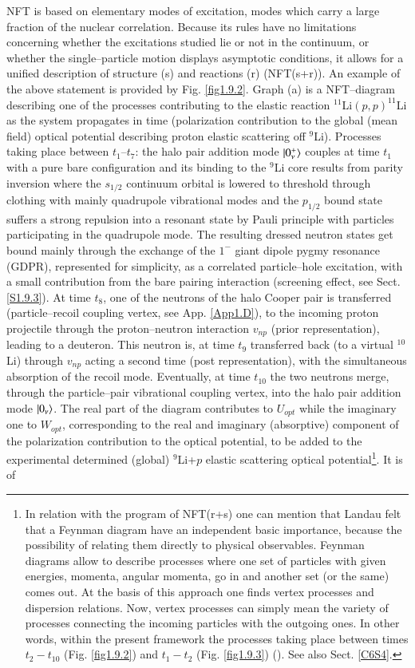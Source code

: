 NFT is based on elementary modes of excitation, modes which carry a large fraction of the nuclear correlation. Because its rules have no limitations concerning whether the excitations studied lie or not in the continuum, or whether the single--particle motion displays asymptotic conditions, it allows for a unified description of structure (s) and reactions (r) (NFT(s+r)). An example of the above statement is provided by Fig. \ref{fig1.9.2}. Graph (a) is a NFT--diagram describing one of the processes contributing to the elastic
reaction $^{11}$Li$(p,p)^{11}$Li as the system propagates in time (polarization contribution to
the global (mean field) optical potential describing proton elastic scattering off $^{9}$Li). Processes taking place between $t_1$--$t_7$:
the halo pair addition mode $|{0^+_\nu} \rangle$ couples at time $t_1$ with a pure bare configuration
and its binding to the $^9$Li core results from parity inversion where the $s_{1/2}$ continuum
orbital is lowered to threshold through clothing with mainly quadrupole vibrational
modes and the $p_{1/2}$ bound state suffers a strong repulsion into a resonant state by
Pauli principle with particles participating in the quadrupole mode. The resulting
dressed neutron states get bound mainly through the exchange of the $1^-$ giant dipole
pygmy resonance (GDPR), represented for simplicity, as a correlated particle--hole
excitation, with a small contribution from the bare pairing interaction (screening effect, see Sect. \ref{S1.9.3}). At time $t_8$, one of the neutrons of the halo Cooper pair is transferred (particle--recoil coupling vertex, see App. \ref{App1.D}), to the incoming proton projectile through the proton--neutron
interaction $v_{np}$ (prior representation), leading to a deuteron. This neutron is,
at time $t_9$ transferred back (to a virtual $^{10}$Li) through $v_{np}$ acting a second time (post
representation), with the simultaneous absorption of the recoil mode. Eventually, at
time $t_{10}$ the two neutrons merge, through the particle--pair vibrational coupling vertex, into the
halo pair addition mode $|{0_\nu} \rangle$. The real part of the diagram contributes to $U_{opt}$ while the
imaginary one to $W_{opt}$, corresponding to the real and imaginary (absorptive) component
of the polarization contribution to the optical potential, to be added to the
experimental determined (global) $^9$Li+$p$ elastic scattering optical potential\footnote{In relation with the program of NFT(r+s) one can mention that Landau felt that a Feynman diagram have an independent basic importance, because the possibility of relating them directly to physical observables. Feynman diagrams allow to describe processes where one set of particles with given energies, momenta, angular momenta, go in and another set (or the same) comes out. At the basis of this approach one finds vertex processes and dispersion relations. Now, vertex processes can simply mean the variety of processes connecting the incoming particles with the outgoing ones. In other words, within the present framework the processes taking place between times $t_2-t_{10}$ (Fig. \ref{fig1.9.2}) and $t_1-t_2$ (Fig. \ref{fig1.9.3}) (\cite{Landau:59,terHaar:69}). See also Sect. \ref{C6S4}.}. It is of
